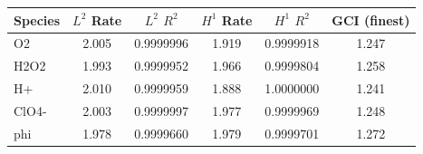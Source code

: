 \begin{tabular}{l S S S S S}
\toprule
Species & {$L^2$ Rate} & {$L^2$ $R^2$} & {$H^1$ Rate} & {$H^1$ $R^2$} & {GCI (finest)} \\
\midrule
O2 & 2.005 & 0.9999996 & 1.919 & 0.9999918 & 1.247 \\
H2O2 & 1.993 & 0.9999952 & 1.966 & 0.9999804 & 1.258 \\
H+ & 2.010 & 0.9999959 & 1.888 & 1.0000000 & 1.241 \\
ClO4- & 2.003 & 0.9999997 & 1.977 & 0.9999969 & 1.248 \\
phi & 1.978 & 0.9999660 & 1.979 & 0.9999701 & 1.272 \\
\bottomrule
\end{tabular}

